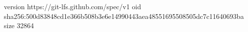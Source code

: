 version https://git-lfs.github.com/spec/v1
oid sha256:500d83848cd1e366b508b3e6e14990443aea48551695508505dc7c11640693ba
size 32864
